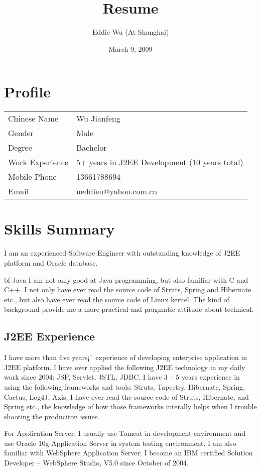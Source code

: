 \documentclass[a4paper,12pt]{article}
\title{Resume}
\author{Eddie Wu (At Shanghai)}
\date{March 9, 2009}
\begin{document}
\maketitle

\section{Profile}

\begin{tabular}{ll}
Chinese Name         & Wu Jianfeng\\
Gender               & Male \\
Degree               & Bachelor\\
Work Experience      & 5+ years in J2EE Development (10 years total)\\
Mobile Phone         & 13661788694\\
Email                & ueddieu@yahoo.com.cn\\
\end{tabular}


\section{Skills Summary}

I am an experienced Software Engineer with outstanding knowledge of J2EE platform and Oracle database. 

{bf Java} I am not only good at Java programming, but also familiar with C and C++. I not only have ever read the source code of Struts, Spring and Hibernate etc., but also have ever read the source code of Linux kernel. The kind of background provide me a more practical and pragmatic attitude about technical.

\subsection{J2EE Experience}
I have more than five years¡¯ experience of developing enterprise application in J2EE platform. I have ever applied the following J2EE technology in my daily work since 2004: JSP, Servlet, JSTL, JDBC. I have 3 -- 5 years experience in using the following frameworks and tools: Struts, Tapestry, Hibernate, Spring, Cactus, Log4J, Axis. I have ever read the source code of Struts, Hibernate, and Spring etc., the knowledge of how those frameworks interally helps when I trouble shooting the produciton issues.

For Application Server, I usually use Tomcat in development environment and use Oracle 10g Application Server in system testing environment. I am also familiar with WebSphere Application Server; I become an IBM certified Solution Developer -- WebSphere Studio, V5.0 since October of 2004.
\end{document}
